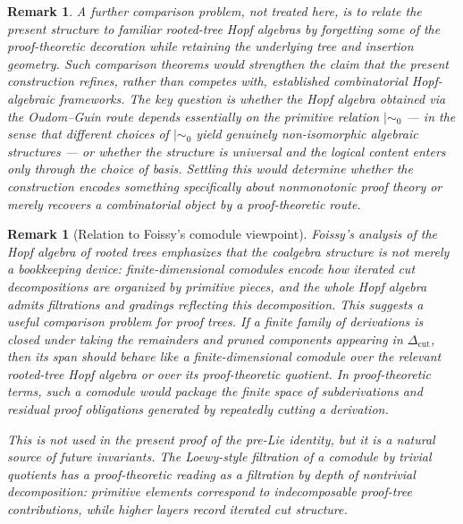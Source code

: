 \documentclass[11pt]{article}
\newtheorem{remark}[theorem]{Remark}
\newcommand{\mszero}{\mathrel{\mid\!\sim_{0}}}
\begin{document}
\begin{remark}
A further comparison problem, not treated here, is to relate the present
structure to familiar rooted-tree Hopf algebras by forgetting some of the
proof-theoretic decoration while retaining the underlying tree and insertion
geometry. Such comparison theorems would strengthen the claim that the present
construction refines, rather than competes with, established combinatorial
Hopf-algebraic frameworks. The key question is whether the Hopf algebra
obtained via the Oudom--Guin route depends essentially on the primitive
relation $\mszero$ --- in the sense that different choices of $\mszero$
yield genuinely non-isomorphic algebraic structures --- or whether the
structure is universal and the logical content enters only through the
choice of basis. Settling this would determine whether the construction
encodes something specifically about nonmonotonic proof theory or merely
recovers a combinatorial object by a proof-theoretic route.
\end{remark}

\begin{remark}[Relation to Foissy's comodule viewpoint]
Foissy's analysis of the Hopf algebra of rooted trees emphasizes that the
coalgebra structure is not merely a bookkeeping device: finite-dimensional
comodules encode how iterated cut decompositions are organized by primitive
pieces, and the whole Hopf algebra admits filtrations and gradings reflecting
this decomposition. This suggests a useful comparison problem for proof trees.
If a finite family of derivations is closed under taking the remainders and
pruned components appearing in \(\Delta_{\mathrm{cut}}\), then its span should
behave like a finite-dimensional comodule over the relevant rooted-tree Hopf
algebra or over its proof-theoretic quotient. In proof-theoretic terms, such a
comodule would package the finite space of subderivations and residual proof
obligations generated by repeatedly cutting a derivation.

This is not used in the present proof of the pre-Lie identity, but it is a
natural source of future invariants. The Loewy-style filtration of a comodule
by trivial quotients has a proof-theoretic reading as a filtration by depth of
nontrivial decomposition: primitive elements correspond to indecomposable
proof-tree contributions, while higher layers record iterated cut structure.
\end{remark}
\end{document}
